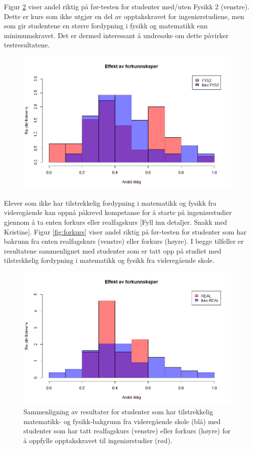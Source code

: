 \documentclass[a4paper,norsk,12pt]{report}
\begin{document}
Figur \ref{fig:fysmat} viser andel riktig på før-testen for studenter med/uten Fysikk 2 (venstre). Dette er kurs som ikke utgjør en del av opptakskravet for ingeniørstudiene, men som gir studentene en større fordypning i fysikk og matematikk enn minimumskravet. Det er dermed interessant å undresøke om dette påvirker testresultatene.
\begin{figure}[p]
\begin{center}
	\includegraphics[width=.48\textwidth]{./fys2}
\end{center}
	\caption{}
	\label{fig:fysmat}
\end{figure}
Elever som ikke har tilstrekkelig fordypning i matematikk og fysikk fra videregående kan oppnå påkrevd kompetanse for å starte på ingeniørstudier gjennom å ta enten forkurs eller realfagskurs {\color{red}[Fyll inn detaljer. Snakk med Kristine]}. Figur \ref{fig:forkurs} viser andel riktig på før-testen for studenter som har bakrunn fra enten realfagskurs (venstre) eller forkurs (høyre). I begge tilfeller er resultatene sammenlignet med studenter som er tatt opp på studiet med tilstrekkelig fordypning i matematikk og fysikk fra videregående skole.
\begin{figure}[p]
	\includegraphics[width=.48\textwidth]{./real}
	\caption{ Sammenligning av resultater for studenter som har tilstrekkelig matematikk- og fysikk-bakgrunn fra videregående skole (blå) med studenter som har tatt realfagskurs (venstre) eller forkurs (høyre) for å oppfylle opptakskravet til ingeniørstudier (rød).}
	\label{fig:fysmat}
\end{figure}
\end{document}
